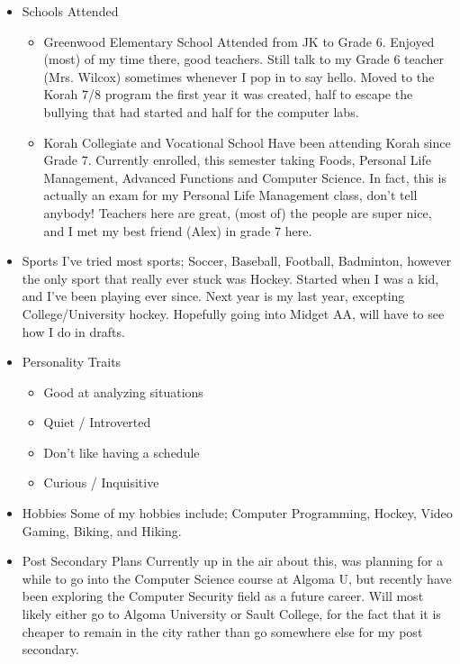 \documentclass[11pt]{article}
\begin{document}
\begin{itemize}
\begin{itemize}
\begin{itemize}
\end{itemize}
\end{itemize}
\item Schools Attended
\label{sec:org7c6c3ad}
\begin{itemize}
\item Greenwood Elementary School
\label{sec:orga455e61}
Attended from JK to Grade 6. Enjoyed (most) of my time there, good teachers. Still talk to my Grade 6 teacher (Mrs. Wilcox) sometimes whenever I pop in to say hello. Moved to the Korah 7/8 program the first year it was created, half to escape the bullying that had started and half for the computer labs. 
\item Korah Collegiate and Vocational School
\label{sec:orgf8e1ed9}
Have been attending Korah since Grade 7. Currently enrolled, this semester taking Foods, Personal Life Management, Advanced Functions and Computer Science. In fact, this is actually an exam for my Personal Life Management class, don't tell anybody! Teachers here are great, (most of) the people are super nice, and I met my best friend (Alex) in grade 7 here.
\end{itemize}
\item Sports
\label{sec:org7df9711}
I've tried most sports; Soccer, Baseball, Football, Badminton, however the only sport that really ever stuck was Hockey. Started when I was a kid, and I've been playing ever since. Next year is my last year, excepting College/University hockey. Hopefully going into Midget AA, will have to see how I do in drafts.
\item Personality Traits
\label{sec:org9a9835f}
\begin{itemize}
\item Good at analyzing situations
\item Quiet / Introverted
\item Don't like having a schedule
\item Curious / Inquisitive
\end{itemize}
\item Hobbies
\label{sec:org4a6b5a9}
Some of my hobbies include; Computer Programming, Hockey, Video Gaming, Biking, and Hiking.
\item Post Secondary Plans
\label{sec:org433e800}
Currently up in the air about this, was planning for a while to go into the Computer Science course at Algoma U, but recently have been exploring the Computer Security field as a future career. Will most likely either go to Algoma University or Sault College, for the fact that it is cheaper to remain in the city rather than go somewhere else for my post secondary.
\end{itemize}
\end{document}
